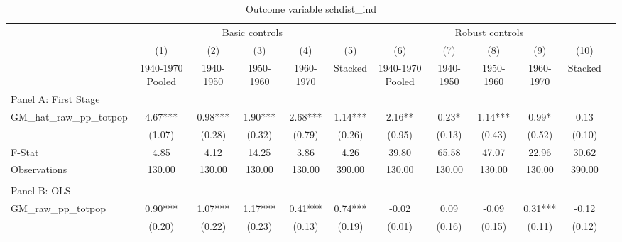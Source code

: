  \begin{table}[htbp]\centering {} \begin{threeparttable} \caption{Outcome variable schdist\_ind} \begin{tabular}{l*{11}{c}} \toprule
          &\multicolumn{5}{c}{Basic controls}                                   &\multicolumn{5}{c}{Robust controls}                                  \\\cmidrule(lr){2-6}\cmidrule(lr){7-11}
          &\multicolumn{1}{c}{(1)}&\multicolumn{1}{c}{(2)}&\multicolumn{1}{c}{(3)}&\multicolumn{1}{c}{(4)}&\multicolumn{1}{c}{(5)}&\multicolumn{1}{c}{(6)}&\multicolumn{1}{c}{(7)}&\multicolumn{1}{c}{(8)}&\multicolumn{1}{c}{(9)}&\multicolumn{1}{c}{(10)}\\
          &\multicolumn{1}{c}{1940-1970 Pooled}&\multicolumn{1}{c}{1940-1950}&\multicolumn{1}{c}{1950-1960}&\multicolumn{1}{c}{1960-1970}&\multicolumn{1}{c}{Stacked}&\multicolumn{1}{c}{1940-1970 Pooled}&\multicolumn{1}{c}{1940-1950}&\multicolumn{1}{c}{1950-1960}&\multicolumn{1}{c}{1960-1970}&\multicolumn{1}{c}{Stacked}\\
\cmidrule(lr){1-11}
\multicolumn{10}{l}{Panel A: First Stage}\\
\cmidrule(lr){1-11}
GM\_hat\_raw\_pp\_totpop&      4.67***&      0.98***&      1.90***&      2.68***&      1.14***&      2.16** &      0.23*  &      1.14***&      0.99*  &      0.13   \\
          &    (1.07)   &    (0.28)   &    (0.32)   &    (0.79)   &    (0.26)   &    (0.95)   &    (0.13)   &    (0.43)   &    (0.52)   &    (0.10)   \\
\midrule
F-Stat    &      4.85   &      4.12   &     14.25   &      3.86   &      4.26   &     39.80   &     65.58   &     47.07   &     22.96   &     30.62   \\
Observations&    130.00   &    130.00   &    130.00   &    130.00   &    390.00   &    130.00   &    130.00   &    130.00   &    130.00   &    390.00   \\
\cmidrule[\heavyrulewidth](lr){1-11} \\ \cmidrule[\heavyrulewidth](lr){1-11}
\multicolumn{10}{l}{Panel B: OLS}\\
\cmidrule(lr){1-11}
GM\_raw\_pp\_totpop&      0.90***&      1.07***&      1.17***&      0.41***&      0.74***&     -0.02   &      0.09   &     -0.09   &      0.31***&     -0.12   \\
          &    (0.20)   &    (0.22)   &    (0.23)   &    (0.13)   &    (0.19)   &    (0.01)   &    (0.16)   &    (0.15)   &    (0.11)   &    (0.12)   \\

\end{tabular}
\end{threeparttable}
\end{table}
